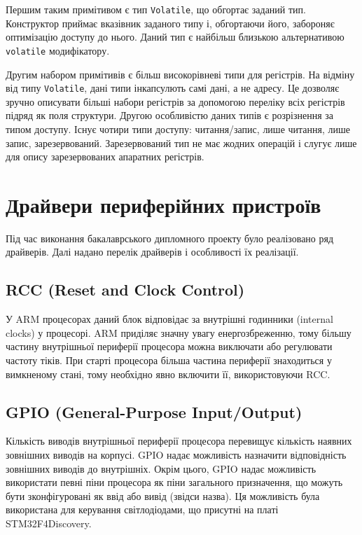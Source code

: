 \documentclass[oneside,14pt,a4paper,final]{myextreport}
\newcommand\code[1]{{\tt #1}}
\begin{document}
Першим таким примітивом є тип \code{Volatile}, що обгортає заданий тип. Конструктор приймає вказівник заданого типу і, обгортаючи його, забороняє оптимізацію доступу до нього. Даний тип є найбільш близькою альтернативою \code{volatile} модифікатору.

Другим набором примітивів є більш високорівневі типи для регістрів. На відміну від типу \code{Volatile}, дані типи інкапсулють самі дані, а не адресу. Це дозволяє зручно описувати більші набори регістрів за допомогою переліку всіх регістрів підряд як поля структури. Другою особливістю даних типів є розрізнення за типом доступу. Існує чотири типи доступу: читання/запис, лише читання, лише запис, зарезервований. Зарезервований тип не має жодних операцій і слугує лише для опису зарезервованих апаратних регістрів.

\section{Драйвери периферійних пристроїв}

Під час виконання бакалаврського дипломного проекту було реалізовано ряд драйверів. Далі надано перелік драйверів і особливості їх реалізації.

\subsection{RCC (Reset and Clock Control)}

  У ARM процесорах даний блок відповідає за внутрішні годинники (internal clocks) у процесорі. ARM приділяє значну увагу енергозбреженню, тому більшу частину внутрішньої периферії процесора можна виключати або регулювати частоту тіків. При старті процесора більша частина периферії знаходиться у вимкненому стані, тому необхідно явно включити її, використовуючи RCC.

\subsection{GPIO (General-Purpose Input/Output)}

  Кількість виводів внутрішньої периферії процесора перевищує кількість наявних зовнішних виводів на корпусі. GPIO надає можливість назначити відповідність зовнішних виводів до внутрішніх. Окрім цього, GPIO надає можливість використати певні піни процесора як піни загального призначення, що можуть бути зконфігуровані як ввід або вивід (звідси назва). Ця можливість була використана для керування світлодіодами, що присутні на платі STM32F4Discovery.
\end{document}
